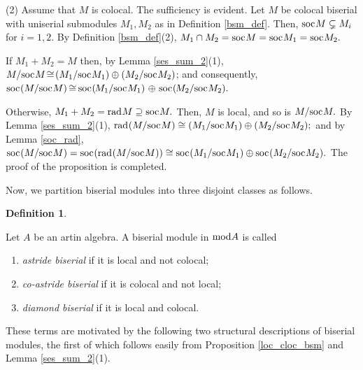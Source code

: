 \documentclass[10pt]{amsart}
\theoremstyle{definition}
\newtheorem{Defn}[Theo]{Definition}
\newcommand{\mmod}{{\rm mod}}
\newcommand{\rad}{{\rm rad}\hspace{.5pt}}
\newcommand{\soc}{{\rm soc}\hspace{.5pt}}
\begin{document}
(2) Assume that $M$ is colocal. The sufficiency is evident. Let $M$ be colocal biserial with uniserial submodules $M_1, M_2$ as in Definition \ref{bsm_def}. Then, $\soc M\subsetneq M_i$ for $i=1, 2$. By Definition \ref{bsm_def}(2), $M_1\cap M_2=\soc M=\soc M_1=\soc M_2.$ 

If $M_1+M_2\!=\! M$ then, by Lemma \ref{ses_sum_2}(1), $M/\soc M %
\!\cong\! (M_1/\soc M_1) \oplus (M_2 /\soc M_2)$; and consequently, $\soc(M/\soc M) \hspace{-1pt} \cong \hspace{-1pt} \soc(\hspace{-1pt} M_1/\soc M_1) \hspace{1pt} \oplus \hspace{1pt} \soc(\hspace{-1pt}M_2/\soc M_2).$ 

Otherwise, $M_1+M_2 = \rad M\supseteq \soc M.$ Then, $M$ is local, and so is $M/\soc M.$ By Lemma \ref{ses_sum_2}(1), $\rad(M/\soc M) %
\cong (M_1/\soc M_1) \oplus (M_2 /\soc M_2);$ and by Lemma \ref{soc_rad}, $\soc(M/\soc M)=\soc(\rad (M/\soc M))\cong  \soc(M_1/\soc M_1)\oplus \soc( M_2/\soc M_2).$ 
The proof of the proposition is completed.

\smallskip

Now, we partition biserial modules into three disjoint classes as follows.

\begin{Defn}\label{as_bsm_def}

Let $A$ be an artin algebra. A biserial module in $\mmod A$ is called 

\begin{enumerate}[$(1)$]

\vspace{-2pt}

\item {\em astride biserial} if it is local and not colocal; 

\item {\em co-astride biserial} if it is colocal and not local; 

\item {\em diamond biserial} if it is local and colocal.
    
\end{enumerate}

\end{Defn}

These terms are motivated by the following two structural descriptions of biserial modules, the first of which %
follows easily from Proposition \ref{loc_cloc_bsm} and Lemma \ref{ses_sum_2}(1).
\end{document}
